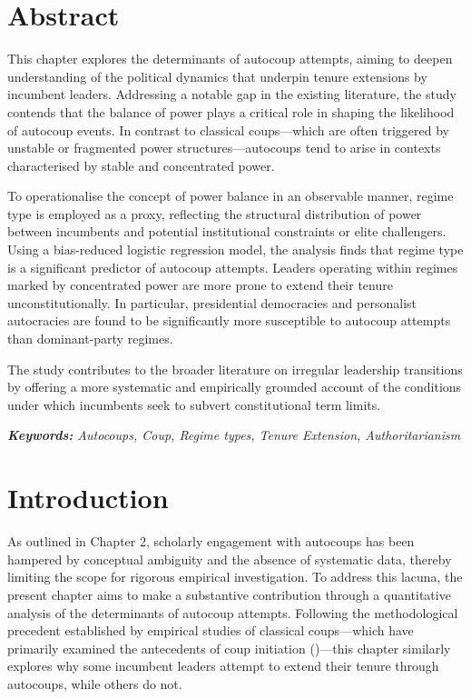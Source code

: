 \documentclass[
  12pt,
]{report}
\begin{document}
\section*{Abstract}\label{abstract-2}

This chapter explores the determinants of autocoup attempts, aiming to
deepen understanding of the political dynamics that underpin tenure
extensions by incumbent leaders. Addressing a notable gap in the
existing literature, the study contends that the balance of power plays
a critical role in shaping the likelihood of autocoup events. In
contrast to classical coups---which are often triggered by unstable or
fragmented power structures---autocoups tend to arise in contexts
characterised by stable and concentrated power.

To operationalise the concept of power balance in an observable manner,
regime type is employed as a proxy, reflecting the structural
distribution of power between incumbents and potential institutional
constraints or elite challengers. Using a bias-reduced logistic
regression model, the analysis finds that regime type is a significant
predictor of autocoup attempts. Leaders operating within regimes marked
by concentrated power are more prone to extend their tenure
unconstitutionally. In particular, presidential democracies and
personalist autocracies are found to be significantly more susceptible
to autocoup attempts than dominant-party regimes.

The study contributes to the broader literature on irregular leadership
transitions by offering a more systematic and empirically grounded
account of the conditions under which incumbents seek to subvert
constitutional term limits.

\emph{\textbf{Keywords:} Autocoups, Coup, Regime types, Tenure
Extension, Authoritarianism}

\newpage

\section{Introduction}\label{introduction-2}

As outlined in Chapter 2, scholarly engagement with autocoups has been
hampered by conceptual ambiguity and the absence of systematic data,
thereby limiting the scope for rigorous empirical investigation. To
address this lacuna, the present chapter aims to make a substantive
contribution through a quantitative analysis of the determinants of
autocoup attempts. Following the methodological precedent established by
empirical studies of classical coups---which have primarily examined the
antecedents of coup initiation ()---this chapter similarly explores why some
incumbent leaders attempt to extend their tenure through autocoups,
while others do not.
\end{document}
